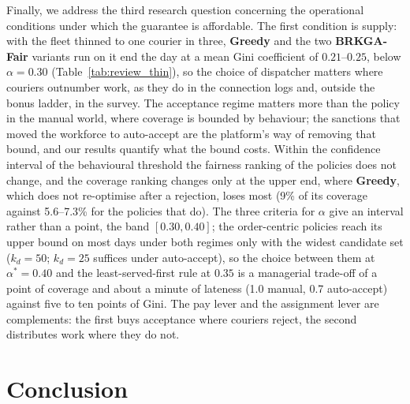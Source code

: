 \documentclass[a4paper,11pt,review,3p,authoryear]{elsarticle}
\begin{document}
Finally, we address the third research question concerning the operational conditions under which the guarantee is affordable. The first condition is supply: with the fleet thinned to one courier in three, \textbf{Greedy} and the two \textbf{BRKGA-Fair} variants run on it end the day at a mean Gini coefficient of $0.21$--$0.25$, below $\alpha = 0.30$ (Table~\ref{tab:review_thin}), so the choice of dispatcher matters where couriers outnumber work, as they do in the connection logs and, outside the bonus ladder, in the survey. The acceptance regime matters more than the policy in the manual world, where coverage is bounded by behaviour; the sanctions that moved the workforce to auto-accept are the platform's way of removing that bound, and our results quantify what the bound costs. Within the confidence interval of the behavioural threshold the fairness ranking of the policies does not change, and the coverage ranking changes only at the upper end, where \textbf{Greedy}, which does not re-optimise after a rejection, loses most (9\% of its coverage against 5.6--7.3\% for the policies that do). The three criteria for $\alpha$ give an interval rather than a point, the band $[0.30, 0.40]$; the order-centric policies reach its upper bound on most days under both regimes only with the widest candidate set ($k_d = 50$; $k_d = 25$ suffices under auto-accept), so the choice between them at $\alpha^* = 0.40$ and the least-served-first rule at $0.35$ is a managerial trade-off of a point of coverage and about a minute of lateness (1.0 manual, 0.7 auto-accept) against five to ten points of Gini. The pay lever and the assignment lever are complements: the first buys acceptance where couriers reject, the second distributes work where they do not.

\section{Conclusion}
\label{sec:Conclusion}
\end{document}
